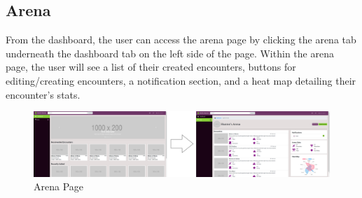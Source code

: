 \documentclass[12pt,a4paper]{report}
\begin{document}
		\subsection{Arena}
		From the dashboard, the user can access the arena page by clicking the arena tab underneath the dashboard tab on the left side of the page. Within the arena page, the user will see a list of their created encounters, buttons for editing/creating encounters, a notification section, and a heat map detailing their encounter's stats.
		\begin{figure}[H]
			\centering
			\centerline{\includegraphics[scale=.16]{arenaNav}}
			\caption{Arena Page}
			\label{fig: Dashboard to Arena}
		\end{figure}
		\newpage
\end{document}
